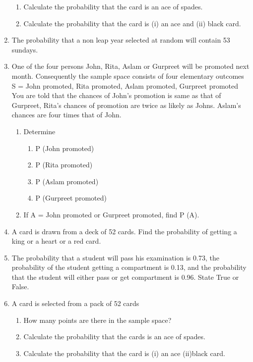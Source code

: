 \begin{enumerate}[label=\thesection.\arabic*,ref=\thesection.\theenumi]
\begin{enumerate}[label=(\alph*)]
    \item Calculate the probability that the card is an ace of spades.
    \item Calculate the probability that the card is (i) an ace and (ii) black card.
\end{enumerate}
\solution

\item The probability that a non leap year selected at random will contain 53 sundays.
\\
\solution

\item One of the four persons John, Rita, Aslam or Gurpreet will be promoted next
month. Consequently the sample space consists of four elementary outcomes
S = {John promoted, Rita promoted, Aslam promoted, Gurpreet promoted}
You are told that the chances of John’s promotion is same as that of Gurpreet,
Rita’s chances of promotion are twice as likely as Johns. Aslam’s chances are
four times that of John.
\begin{enumerate}
	\item Determine
	\begin{enumerate}
		\item P (John promoted)
		\item P (Rita promoted)
		\item P (Aslam promoted)
		\item P (Gurpreet promoted)
	\end{enumerate}
	\item If A = {John promoted or Gurpreet promoted}, find P (A).
\end{enumerate}
\solution

\item A card is drawn from a deck of 52 cards. Find the probability of getting a king or a heart or a red card.\\
\solution

\item The probability that a student will pass his examination is 0.73, the probability of
the student getting a compartment is 0.13, and the probability that the student will
either pass or get compartment is 0.96. State True or False.\\
\solution

\item A card is selected from a pack of 52 cards\\
\begin{enumerate}[label=(\alph*)]
\item How many points are there in the sample space?
\item Calculate the probability that the cards is an ace of spades.
\item Calculate the probability that the card is (i) an ace (ii)black card.\\
\end{enumerate}

\end{enumerate}

